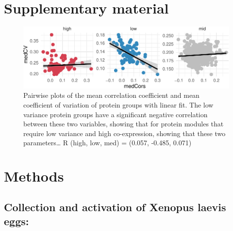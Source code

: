 \documentclass[11pt,]{article}
\begin{document}
\newpage

\hypertarget{supplementary-material}{%
\section*{Supplementary material}\label{supplementary-material}}

\setcounter{table}{0}  \renewcommand{\thetable}{S\arabic{table}} \setcounter{figure}{0} \renewcommand{\thefigure}{S\arabic{figure}}

\begin{figure}
\centering
\includegraphics{output/figures/sup_fig_1-1.pdf}
\caption{Pairwise plots of the mean correlation coefficient and mean
coefficient of variation of protein groups with linear fit. The low
variance protein groups have a significant negative correlation between
these two variables, showing that for protein modules that require low
variance and high co-expression, showing that these two
parameters\ldots{} R (high, low, med) = (0.057, -0.485, 0.071)}
\end{figure}

\newpage

\hypertarget{methods}{%
\section{Methods}\label{methods}}

\hypertarget{collection-and-activation-of-xenopus-laevis-eggs}{%
\subsection{Collection and activation of Xenopus laevis
eggs:}\label{collection-and-activation-of-xenopus-laevis-eggs}}
\end{document}
